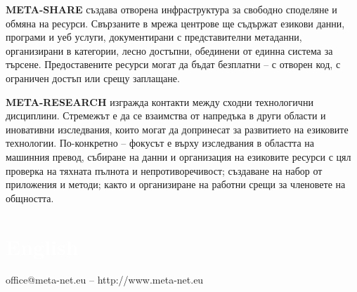 \begin{multicols}{2}
  \textbf{META-SHARE} създава отворена инфраструктура за свободно
  споделяне и обмяна на ресурси. Свързаните в мрежа центрове ще съдържат
  езикови данни, програми и уеб услуги, документирани с представителни
  метаданни, организирани в категории, лесно достъпни, обединени от
  единна система за търсене.  Предоставените ресурси могат да бъдат
  безплатни -- с отворен код, с ограничен достъп или срещу
  заплащане. 

  \textbf{META-RESEARCH} изгражда контакти между сходни технологични
  дисциплини. Стремежът е да се взаимства от напредъка в други
  области и иновативни изследвания, които могат да допринесат за
  развитието на езиковите технологии.  По-конкретно -- фокусът е върху изследвания в областта на машинния превод, събиране на данни и организация на езиковите ресурси с цял проверка на тяхната пълнота и непротиворечивост; създаване на набор от приложения и методи; както и организиране на работни срещи за членовете на общността.
  \end{multicols}

  \vfill

  \makeatletter
  {
    \renewcommand*{\theHsection}{\thepart.\thesection}
  }
  \makeatother
  \part*{\textcolor{white}{English}}
  \setcounter{section}{0}
  \setcounter{figure}{0}

  \centerline{office@meta-net.eu -- http://www.meta-net.eu}


  \cleardoublepage




